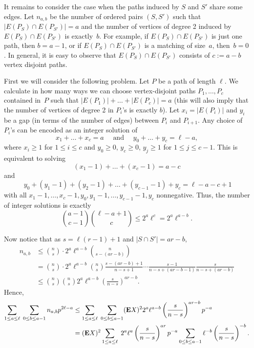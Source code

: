 \documentclass[12pt,reqno]{amsart}
\theoremstyle{remark}
\def\E{\mbox{{\bf E}}}
\def\E{\mbox{{\bf E}}}
\begin{document}
It remains to consider the case when the paths induced by $S$ and $S'$ share some edges. Let $n_{a,b}$ be the number of ordered pairs $(S,S')$ such that $|E(P_S) \cap E(P_{S'})|=a$ and the number of vertices of degree 2 induced by $E(P_S) \cap E(P_{S'})$ is exactly~$b$. For example, if $E(P_S) \cap E(P_{S'})$ is just one path, then $b=a-1$, or if $E(P_S) \cap E(P_{S'})$ is a matching of size~$a$, then~$b=0$. In general, it is easy to observe that $E(P_S) \cap E(P_{S'})$ consists of $c:=a-b$ vertex disjoint paths. 

First we will consider the following problem. Let $P$ be a path of length $\ell$. We calculate in how many ways we can choose vertex-disjoint paths $P_1,\dots,P_c$ contained in~$P$ such that $|E(P_1)|+\dots+|E(P_c)|=a$ (this will also imply that the number of vertices of degree 2 in $P_i$'s is exactly $b$). Let $x_i=|E(P_i)|$ and $y_i$ be a gap (in terms of the number of edges) between $P_i$ and $P_{i+1}$. Any choice of $P_i$'s can be encoded as an integer solution of 
\[
x_1+\dots+x_c = a \quad\text{ and }\quad y_0+\dots+y_c=\ell-a,
\]
where $x_i\ge 1$ for $1\le i\le c$ and $y_0\ge 0$, $y_c\ge 0$, $y_j\ge 1$ for $1\le j\le c-1$. This is equivalent to solving
\[
(x_1-1)+\dots+(x_c-1) = a-c 
\]
and
\[
\ y_0+(y_1-1)+(y_2-1)+\dots+(y_{c-1}-1)+y_c=\ell-a-c+1
\]
with all $x_{1}-1, \ldots, x_{c}-1, y_{0}, y_{1}-1, \ldots, y_{c-1}- 1, y_{c}$ nonnegative.
Thus, the number of integer solutions is exactly
\[
\binom{a-1}{c-1} \binom{\ell-a+1}{c} \le 2^a \ell^{c} = 2^a \ell^{a-b}.
\]


Now notice that as $s=\ell(r-1)+1$ and $|S \cap S'|=a r-b$,
\begin{align*}
n_{a,b} &\le \binom{n}{s} \cdot 2^a \ell^{a-b}\binom{n}{s-(ar-b)}\\
&= \binom{n}{s} \cdot 2^a \ell^{a-b}\binom{n}{s} \frac{s-(ar-b)+1}{n-s+1}\cdots \frac{s-1}{n-s+(ar-b-1)}
\frac{s}{n-s+(ar-b)}\\
&\le \binom{n}{s} \binom{n}{s} 2^a \ell^{a-b}\left(\frac{s}{n-s}\right)^{ar-b}.
\end{align*}
Hence,
\begin{align*}
\sum_{1\le a \le \ell}\; \sum_{0\le b \le a-1} n_{a,b} p^{2\ell-a}
&\le \sum_{1\le a \le \ell}\; \sum_{0\le b \le a-1} (\E X)^2  2^a\ell^{a-b} \left(\frac{s}{n-s}\right)^{ar-b} p^{-a}\\
&= (\E X)^2 \sum_{1\le a \le \ell}\; 2^a\ell^{a} \left(\frac{s}{n-s}\right)^{ar} p^{-a} \sum_{0\le b \le a-1}  \ell^{-b} \left(\frac{s}{n-s}\right)^{-b}. 
\end{align*}
\end{document}
